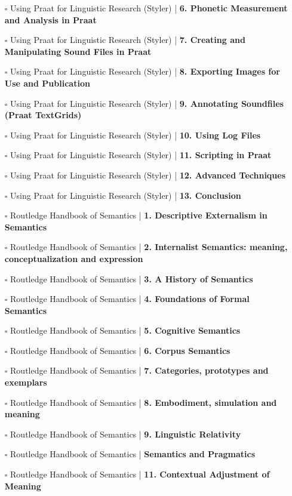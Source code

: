 \documentclass[a4, landscape, 12pt]{article}
\newcommand{\checkbox}{$\square$}%
\begin{document}
\begin{itemize}
{}
\item [\checkbox]  Using Praat for Linguistic Research (Styler) | \textbf{ 6. Phonetic Measurement and Analysis in Praat
}
\item [\checkbox]  Using Praat for Linguistic Research (Styler) | \textbf{ 7. Creating and Manipulating Sound Files in Praat
}
\item [\checkbox]  Using Praat for Linguistic Research (Styler) | \textbf{ 8. Exporting Images for Use and Publication
}
\item [\checkbox]  Using Praat for Linguistic Research (Styler) | \textbf{ 9. Annotating Soundfiles (Praat TextGrids)
}
\item [\checkbox]  Using Praat for Linguistic Research (Styler) | \textbf{ 10. Using Log Files
}
\item [\checkbox]  Using Praat for Linguistic Research (Styler) | \textbf{ 11. Scripting in Praat
}
\item [\checkbox]  Using Praat for Linguistic Research (Styler) | \textbf{ 12. Advanced Techniques
}
\item [\checkbox]  Using Praat for Linguistic Research (Styler) | \textbf{ 13. Conclusion
}
\item [\checkbox]  Routledge Handbook of Semantics | \textbf{ 1. Descriptive Externalism in Semantics
}
\item [\checkbox]  Routledge Handbook of Semantics | \textbf{ 2. Internalist Semantics: meaning, conceptualization and expression
}
\item [\checkbox]  Routledge Handbook of Semantics | \textbf{ 3. A History of Semantics
}
\item [\checkbox]  Routledge Handbook of Semantics | \textbf{ 4. Foundations of Formal Semantics
}
\item [\checkbox]  Routledge Handbook of Semantics | \textbf{ 5. Cognitive Semantics
}
\item [\checkbox]  Routledge Handbook of Semantics | \textbf{ 6. Corpus Semantics
}
\item [\checkbox]  Routledge Handbook of Semantics | \textbf{ 7. Categories, prototypes and exemplars
}
\item [\checkbox]  Routledge Handbook of Semantics | \textbf{ 8. Embodiment, simulation and meaning
}
\item [\checkbox]  Routledge Handbook of Semantics | \textbf{ 9. Linguistic Relativity
}
\item [\checkbox]  Routledge Handbook of Semantics | \textbf{ Semantics and Pragmatics
}
\item [\checkbox]  Routledge Handbook of Semantics | \textbf{ 11. Contextual Adjustment of Meaning
}
\end{itemize}
\end{document}
